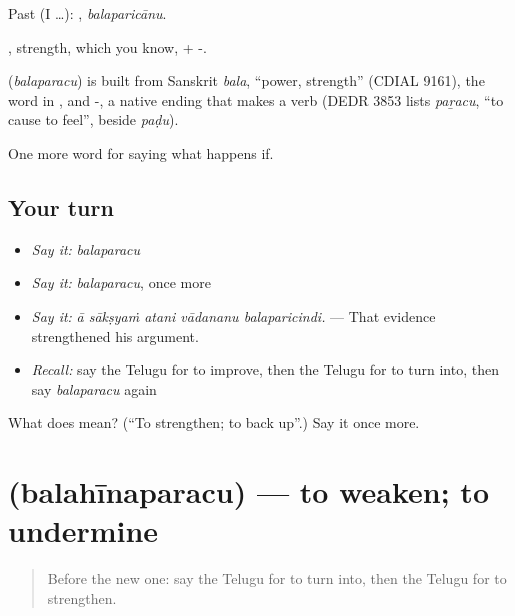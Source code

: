 Past (I …): , \emph{balaparicānu}.

, strength, which you know, + -.

\begin{cousinweb}
\textbf{} (\emph{balaparacu}) is built from Sanskrit \emph{bala}, \textquotedblleft{}power, strength\textquotedblright{} (CDIAL 9161), the word in , and -, a native ending that makes a verb (DEDR 3853 lists \emph{paṟacu}, \textquotedblleft{}to cause to feel\textquotedblright{}, beside \emph{paḍu}).
\end{cousinweb}

\begin{grammarlens}[title={What you've built}]
One more word for saying what happens if.
\end{grammarlens}

\subsection*{Your turn}
\begin{itemize}
\raggedright
  \item \emph{Say it:} \emph{balaparacu}
  \item \emph{Say it:} \emph{balaparacu}, once more
  \item \emph{Say it:} \emph{ā sākṣyaṁ atani vādananu balaparicindi.} — That evidence strengthened his argument.
  \item \emph{Recall:} say the Telugu for to improve, then the Telugu for to turn into, then say \emph{balaparacu} again
\end{itemize}

\begin{tcolorbox}[breakable,colback=teal!4,colframe=teal!35!black,title={Before you move on}]
What does  mean? (\textquotedblleft{}To strengthen; to back up\textquotedblright{}.) Say it once more.
\end{tcolorbox}
\section[\texorpdfstring{\te{బలహీనపరచు} (balahīnaparacu)}{బలహీనపరచు (balahīnaparacu)}]{ (balahīnaparacu) — to weaken; to undermine}

\label{lesson:TE-C430-balahinaparacu}



\begin{quote}
Before the new one: say the Telugu for to turn into, then the Telugu for to strengthen.
\end{quote}

